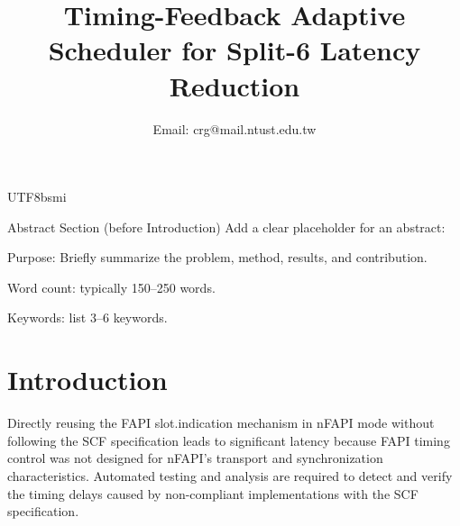 \documentclass[conference]{IEEEtran}
\begin{document}
\begin{CJK}{UTF8}{bsmi}
\title{Timing-Feedback Adaptive Scheduler for Split-6 Latency Reduction}
\author{
\author{
  Email: crg@mail.ntust.edu.tw
}

}

\maketitle

Abstract Section (before Introduction)
Add a clear placeholder for an abstract:

Purpose: Briefly summarize the problem, method, results, and contribution.

Word count: typically 150–250 words.

Keywords: list 3–6 keywords.

\section{Introduction}
{\color{blue}
Directly reusing the FAPI slot.indication mechanism in nFAPI mode without following the SCF specification leads to significant latency because FAPI timing control was not designed for nFAPI’s transport and synchronization characteristics. Automated testing and analysis are required to detect and verify the timing delays caused by non-compliant implementations with the SCF specification.

}
\end{CJK}
\end{document}
